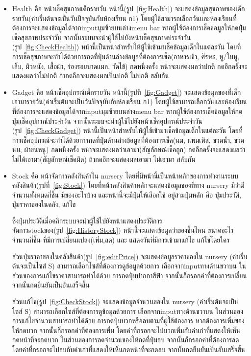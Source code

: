 \begin{itemize}
  \item  Health คือ หน้าเช็คสุขภาพเด็กรายวัน หน้านี้(รูป~\ref{fig:Health}) จะแสดงข้อมูลสุขภาพของเด็กรายวัน(ค่าเริ่มต้นจะเป็นวันปัจจุบันกับห้องเรียน ก1) โดยผู้ใช้สามารถเลือกวันและห้องเรียนที่ต้องการจะแสดงข้อมูลได้จากinputมุมซ้ายบนล่างmenu bar 
  หากผู้ใช้ต้องการเช็คข้อมูลให้กดปุ่มเช็คสุขภาพประจำวัน จากนั้นระบบจะนำผู้ใช้ไปยังหน้าเช็คสุขภาพประจำวัน (รูป~\ref{fig:CheckHealth}) 
  หน้านี้เป็นหน้าสำหรับให้ผู้ใช้เข้ามาเช็คข้อมูลเด็กในแต่ละวัน โดยที่การเช็คสุขภาพจะทำได้ด้วยการกดที่ปุ่มด้านล่างข้อมูลที่ต้องการเช็ค(อาหารเช้า, ศีรษะ, หู/ใบหู, เล็บ, ผิวหนัง, เสื้อผ้า, ร่องรอยบาดแผล, วัดไข้) กดหนึ่งครั้ง
  หน้าจะแสดงผลว่าปกติ กดอีกครั้งจะแสดงผลว่าไม่ปกติ ถ้ากดอีกจะแสดงผลเป็นปกติ ไม่ปกติ สลับกัน


  \item  Gadget คือ หน้าเช็คอุปกรณ์เด็กรายวัน หน้านี้(รูปที่~\ref{fig:Gadget}) จะแสดงข้อมูลของที่เด็กเอามารายวัน(ค่าเริ่มต้นจะเป็นวันปัจจุบันกับห้องเรียน ก1) โดยผู้ใช้สามารถเลือกวันและห้องเรียนที่ต้องการจะแสดงข้อมูลได้จากinputมุมซ้ายบนล่างmenu bar 
  หากผู้ใช้ต้องการเช็คข้อมูลให้กดปุ่มเช็คอุปกรณ์ประจำวัน จากนั้นระบบจะนำผู้ใช้ไปยังหน้าเช็คอุปกรณ์ประจำวัน (รูป~\ref{fig:CheckGadget}) 
  หน้านี้เป็นหน้าสำหรับให้ผู้ใช้เข้ามาเช็คข้อมูลเด็กในแต่ละวัน โดยที่การเช็คอุปกรณ์จะทำได้ด้วยการกดที่ปุ่มด้านล่างข้อมูลที่ต้องการเช็ค(นม, แพมเพิส, ขวดน้ำ, ขวดนม, ผ้าขนหนู) กดหนึ่งครั้ง
  หน้าจะแสดงผลว่าเอามา(สัญลักษณ์เช็คถูก) กดอีกครั้งจะแสดงผลว่าไม่ได้เอามา(สัญลักษณ์เช็คผิด) ถ้ากดอีกจะแสดงผลเอามา ไม่เอามา สลับกัน
  
  \item  Stock คือ หน้าจัดการคลังสินค้าใน nursery โดยที่มีหน้านี้เป็นหน้าหลักของการทำงานระบบคลังสินค้า(รูปที่~\ref{fig:Stock}) โดยที่หน้าคลังสินค้าหลักจะแสดงข้อมูลของที่ทาง nursery มีว่ามีจำนวนทั้งหมดกี่ชิ้น มีของอะไรบ้าง และหน้านี้จะมีปุ่มให้เลือกใช้
  อยู่สามปุ่มหลัก คือ ปุ่มประวัติ, ปุ่มราคาของในคลัง, แก้ไข 
  
  ซึ่งปุ่มประวัติเมื่อคลิกระบบจะนำผู้ใช้ไปยังหน้าแสดงประวัติการจัดการstockของ(รูป~\ref{fig:HistoryStock}) หน้านี้จะแสดงข้อมูลว่าของชิ้นไหน ขนาดอะไร จำนวนกี่ชิ้น ที่มีการเปลี่ยนแปลง(เพิ่ม,ลด) และ แสดงวันที่มีการเข้ามาแก้ไข แก้ไขโดยใคร
  
  ส่วนปุ่มราคาของในคลังสินค้า(รูป~\ref{fig:editPrice}) จะแสดงข้อมูลราคาของใน nursery (ค่าเริ่มต้นจะเป็นไซส์ S) สามารถเลือกไซส์ที่ต้องการดูข้อมูลด้วยการ เลือกจากinputทางด้านขวาบน ในส่วนของการแก้ไขราคาสามารถทำได้ด้วย การกดปุ่มปากกาสีฟ้า จากนั้นก็กรอกค่าที่ต้องการเปลี่ยน
  จากนั้นกดยืนยันเป็นอันเสร็จสิ้น
  
  ส่วนแก้ไข(รูป~\ref{fig:CheckStock}) จะแสดงข้อมูลจำนวนของใน nursery (ค่าเริ่มต้นจะเป็นไซส์ S) สามารถเลือกไซส์ที่ต้องการดูข้อมูลด้วยการ เลือกจากinputทางด้านขวาบน ในส่วนของการแก้ไขจำนวนสามารถทำได้ด้วย การกดปุ่มบวกหรือลบตามที่ผู้ใช้ต้องการ หากต้องการเพิ่มของให้กดบวก จากนั้นก็กรอกค่าที่ต้องการเพิ่ม
  โดยค่าที่กรอกจะไปบวกเพิ่มกับค่าเก่าที่แสดงให้เห็นกดหน้าที่จะกดบวก ในส่วนของการลดจำนวนของให้กดที่ปุ่มลบ จากนั้นก็กรอกค่าที่ต้องการลด โดยค่าที่กรอกจะไปลบกับค่าเก่าที่แสดงให้เห็นกดหน้าที่จะกดลบ จากนั้นกดยืนยันเป็นอันเสร็จสิ้น
  

\end{itemize}
